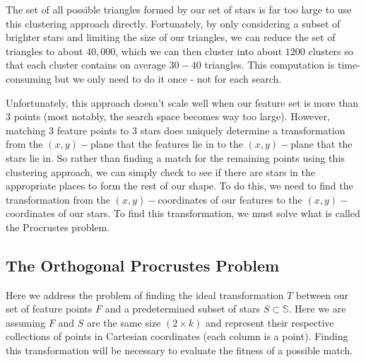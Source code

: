 \documentclass[paper=a4, fontsize=11pt]{scrartcl} %
\begin{document}
The set of all possible triangles formed by our set of stars is far too large to use this clustering approach directly. Fortunately, by only considering a subset of brighter stars and limiting the size of our triangles, we can reduce the set of triangles to about $40,000$, which we can then cluster into about $1200$ clusters so that each cluster contains on average $30-40$ triangles.  This computation is time-consuming but we only need to do it once - not for each search.



Unfortunately, this approach doesn't scale well when our feature set is more than 3 points (most notably, the search space becomes way too large). However, matching 3 feature points to 3 stars does uniquely determine a transformation from the $(x,y)-$plane that the features lie in to the $(x,y)-$plane that the stars lie in. So rather than finding a match for the remaining points using this clustering approach, we can simply check to see if there are stars in the appropriate places to form the rest of our shape. To do this, we need to find the transformation from the $(x,y)-$coordinates of our features to the $(x,y)-$coordinates of our stars. To find this transformation, we must solve what is called the Procrustes problem.


\subsection{The Orthogonal Procrustes Problem\cite{Everson1997}}
Here we address the problem of finding the ideal transformation $T$ between our set of feature points $F$ and a predetermined subset of stars $S\subset \mathbb{S}$. Here we are assuming $F$ and $S$ are the same size $(2\times k)$ and represent their respective collections of points in Cartesian coordinates (each column is a point).  Finding this transformation will be necessary to evaluate the fitness of a possible match.
\end{document}
